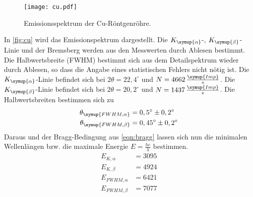 \begin{figure}
  \centering
  \texttt{[image: cu.pdf]}
  \caption{Emissionsspektrum der Cu-Röntgenröhre.}
  \label{fig:cu}
\end{figure}
In \autoref{fig:cu} wird das Emissionspektrum dargestellt. Die $K_{\symup{\alpha}}$-, $K_{\symup{\beta}}$-Linie und
der Bremsberg werden aus den Messwerten durch Ablesen bestimmt. Die Halbwertsbreite (FWHM) bestimmt sich aus dem
Detailspektrum wieder durch Ablesen, so dass die Angabe eines statistischen Fehlers nicht nötig ist.
Die $K_{\symup{\alpha}}$-Linie befindet sich bei $2\theta=22,4^{\circ}$ und 
$N = 4662\,\frac{\symup{Imp}}{\unit{\second}}$. Die $K_{\symup{\beta}}$-Linie befindet sich bei 
$2\theta=20,2^{\circ}$ und $N = 1437\,\frac{\symup{Imp}}{\unit{\second}}$. Die Halbwertsbreiten bestimmen sich zu
\begin{align*}
  \theta_{\symup{FWHM, \alpha}} &= 0,5^{\circ} \pm 0,2^{\circ} \\
  \theta_{\symup{FWHM, \beta}} &= 0,45^{\circ} \pm 0,2^{\circ}\\
\end{align*}
Daraus und der Bragg-Bedingung aus \autoref{eqn:bragg} lassen sich nun die minimalen Wellenlängen bzw.
die maximale Energie $E = \frac{hc}{\lambda}$ bestimmen.
\begin{align*}
  E_{K,\alpha}                &= 3095\\
  E_{K, \beta}                &= 4924\\
  E_{FWHM,\alpha}             &= 6421\\
  E_{FWHM,\beta}              &= 7077\\
\end{align*}